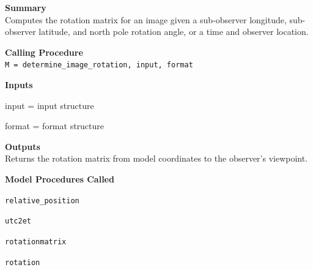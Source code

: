 \documentclass[11pt]{article}
\newcommand\descrip[1]{\textsf{\textbf{\large{#1}}}\\}
\begin{document}
\descrip{Summary}

Computes the rotation matrix for an image given a sub-observer longitude, 
sub-observer latitude, and
north pole rotation angle, or a time and observer location.

\descrip{Calling Procedure}

\verb+M = determine_image_rotation, input, format+

\descrip{Inputs}
\begin{compactenum} \listup
\item input = input structure
\item format = format structure
\end{compactenum}

\descrip{Outputs}
Returns the rotation matrix from model coordinates to the observer's viewpoint.

\descrip{Model Procedures Called}
\begin{compactenum} \listup
\item \texttt{relative\_position}
\item \texttt{utc2et}
\item \texttt{rotationmatrix}
\item \texttt{rotation}
\end{compactenum}
\end{document}
